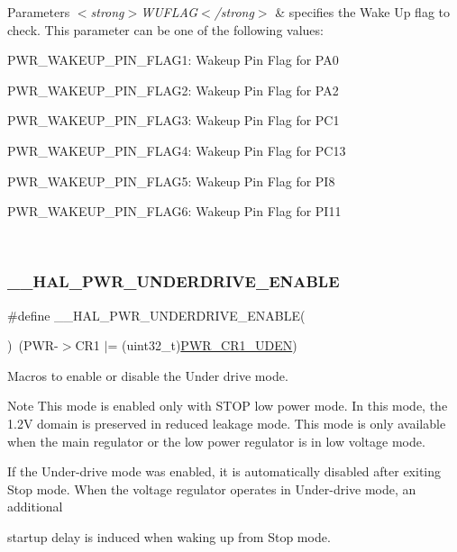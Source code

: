 \begin{DoxyParams}{Parameters}
{\em $<$strong$>$\+W\+U\+F\+L\+A\+G$<$/strong$>$} & specifies the Wake Up flag to check. This parameter can be one of the following values\+: \begin{DoxyItemize}
\item P\+W\+R\+\_\+\+W\+A\+K\+E\+U\+P\+\_\+\+P\+I\+N\+\_\+\+F\+L\+A\+G1\+: Wakeup Pin Flag for P\+A0 \item P\+W\+R\+\_\+\+W\+A\+K\+E\+U\+P\+\_\+\+P\+I\+N\+\_\+\+F\+L\+A\+G2\+: Wakeup Pin Flag for P\+A2 \item P\+W\+R\+\_\+\+W\+A\+K\+E\+U\+P\+\_\+\+P\+I\+N\+\_\+\+F\+L\+A\+G3\+: Wakeup Pin Flag for P\+C1 \item P\+W\+R\+\_\+\+W\+A\+K\+E\+U\+P\+\_\+\+P\+I\+N\+\_\+\+F\+L\+A\+G4\+: Wakeup Pin Flag for P\+C13 \item P\+W\+R\+\_\+\+W\+A\+K\+E\+U\+P\+\_\+\+P\+I\+N\+\_\+\+F\+L\+A\+G5\+: Wakeup Pin Flag for P\+I8 \item P\+W\+R\+\_\+\+W\+A\+K\+E\+U\+P\+\_\+\+P\+I\+N\+\_\+\+F\+L\+A\+G6\+: Wakeup Pin Flag for P\+I11 \end{DoxyItemize}
\\
\hline
\end{DoxyParams}
\mbox{\label{group___p_w_r_ex___exported___macro_gafbaac4011a44566b0ba2a563736cca09}} 
\subsubsection{\texorpdfstring{\_\_HAL\_PWR\_UNDERDRIVE\_ENABLE}{\_\_HAL\_PWR\_UNDERDRIVE\_ENABLE}}
{\footnotesize\ttfamily \#define \+\_\+\+\_\+\+H\+A\+L\+\_\+\+P\+W\+R\+\_\+\+U\+N\+D\+E\+R\+D\+R\+I\+V\+E\+\_\+\+E\+N\+A\+B\+LE(\begin{DoxyParamCaption}{ }\end{DoxyParamCaption})~(P\+WR-\/$>$C\+R1 $\vert$= (uint32\+\_\+t)\mbox{\hyperlink{group___peripheral___registers___bits___definition_gae462863ec79bc72219fc3e0c3180b39a}{P\+W\+R\+\_\+\+C\+R1\+\_\+\+U\+D\+EN}})}



Macros to enable or disable the Under drive mode. 

\begin{DoxyNote}{Note}
This mode is enabled only with S\+T\+OP low power mode. In this mode, the 1.\+2V domain is preserved in reduced leakage mode. This mode is only available when the main regulator or the low power regulator is in low voltage mode.

If the Under-\/drive mode was enabled, it is automatically disabled after exiting Stop mode. When the voltage regulator operates in Under-\/drive mode, an additional
\end{DoxyNote}
startup delay is induced when waking up from Stop mode. 